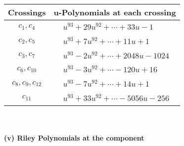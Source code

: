 \documentclass[1p]{elsarticle_modified}
\theoremstyle{definition}
\begin{document}
\begin{tabular}{m{50pt}|m{274pt}}
Crossings & \hspace{64pt}u-Polynomials at each crossing \\
\hline $$\begin{aligned}c_{1},c_{4}\end{aligned}$$&$\begin{aligned}
&u^{93}+29 u^{92}+\cdots+33 u-1
\end{aligned}$\\
\hline $$\begin{aligned}c_{2},c_{5}\end{aligned}$$&$\begin{aligned}
&u^{93}+7 u^{92}+\cdots+11 u+1
\end{aligned}$\\
\hline $$\begin{aligned}c_{3},c_{7}\end{aligned}$$&$\begin{aligned}
&u^{93}-2 u^{92}+\cdots+2048 u-1024
\end{aligned}$\\
\hline $$\begin{aligned}c_{6},c_{10}\end{aligned}$$&$\begin{aligned}
&u^{93}-3 u^{92}+\cdots-120 u+16
\end{aligned}$\\
\hline $$\begin{aligned}c_{8},c_{9},c_{12}\end{aligned}$$&$\begin{aligned}
&u^{93}-7 u^{92}+\cdots+14 u+1
\end{aligned}$\\
\hline $$\begin{aligned}c_{11}\end{aligned}$$&$\begin{aligned}
&u^{93}+33 u^{92}+\cdots-5056 u-256
\end{aligned}$\\
\hline
\end{tabular}\\~\\
\newpage\renewcommand{\arraystretch}{1}
\flushleft \textbf{(v) Riley Polynomials at the component}\newline \\
\end{document}
